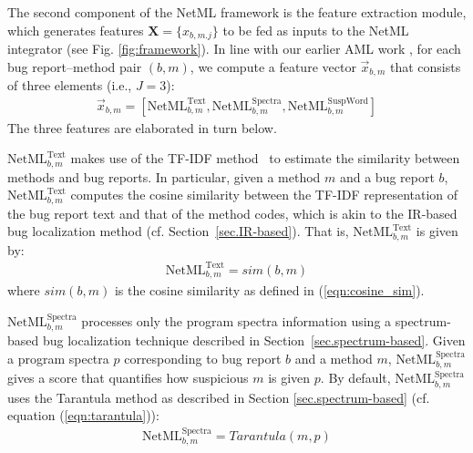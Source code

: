 The second component of the NetML framework is the feature extraction module, which generates features $\mathbf{X} = \{ x_{b,m.j} \}$ to be fed as inputs to the NetML integrator (see  Fig. \ref{fig:framework}). In line with our earlier AML work \cite{Le:2015:IRS:2786805.2786880}, for each bug report--method pair $(b,m)$, we compute a feature vector $\vec{x}_{b,m}$  that consists of three elements (i.e., $J = 3$):
\begin{align}
\vec{x}_{b,m} = \left[ \text{NetML}^\text{Text}_{b,m}, \text{NetML}^\text{Spectra}_{b, m}, \text{NetML}^\text{SuspWord}_{b,m} \right]
\end{align}
The three features are elaborated in turn below.



$\text{NetML}^\text{Text}_{b,m}$ makes use of the TF-IDF method~\cite{Ramos1999} to estimate the similarity between methods and bug reports. In particular, given a method $m$ and a bug report $b$, $\text{NetML}^\text{Text}_{b,m}$ computes the cosine similarity between the TF-IDF representation of the bug report text and that of the method codes, which is akin to the IR-based bug localization method (cf. Section~\ref{sec.IR-based}). That is, $\text{NetML}^\text{Text}_{b,m}$ is given by:
\begin{align}
\text{NetML}^\text{Text}_{b,m} = sim(b,m)	
\end{align}
where $sim(b,m)$ is the cosine similarity as defined in (\ref{eqn:cosine_sim}).


$\text{NetML}^\text{Spectra}_{b, m}$ processes only the program spectra information using a spectrum-based bug localization technique described in Section~\ref{sec.spectrum-based}. Given a program spectra $p$ corresponding to bug report $b$ and a method $m$, $\text{NetML}^\text{Spectra}_{b, m}$ gives a score that quantifies how suspicious  $m$ is given $p$. By default, $\text{NetML}^\text{Spectra}_{b, m}$ uses the Tarantula method as described in Section \ref{sec.spectrum-based} (cf. equation (\ref{eqn:tarantula})):
\begin{align}
\text{NetML}^\text{Spectra}_{b, m} = Tarantula(m, p)
\end{align}


